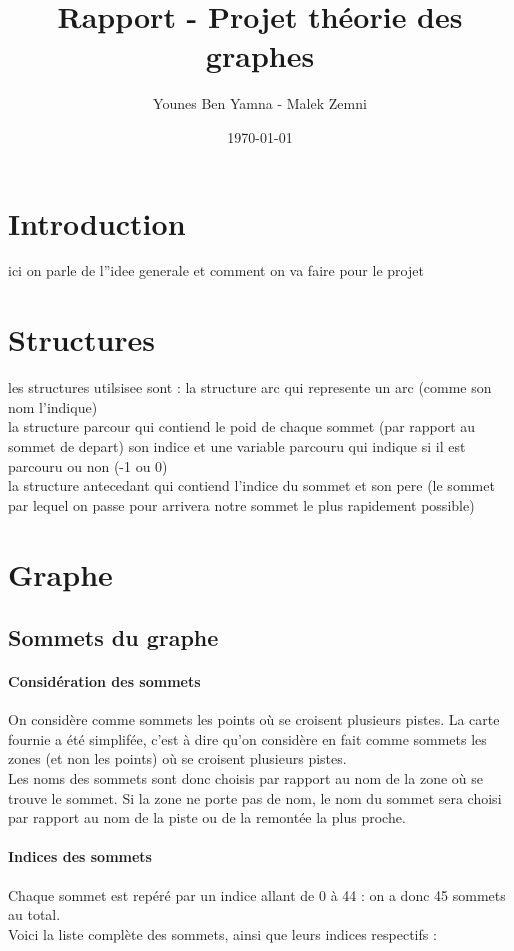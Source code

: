 \documentclass[a4]{article}
\author{Younes Ben Yamna - Malek Zemni}
\title{Rapport - Projet théorie des graphes}
\date{\today}
\begin{document}
\lstset{language=C}
\maketitle

	\section{Introduction}
			ici on parle de l''idee generale et comment on va faire pour le projet
	\section{Structures}
		les structures utilsisee sont :
			la structure arc qui represente un arc (comme son nom l'indique)\\
			la structure parcour qui contiend le poid de chaque sommet (par rapport au sommet de depart)
			 son indice et une variable parcouru qui indique si il est parcouru ou non (-1 ou 0)\\
			la structure antecedant qui contiend l'indice du sommet et son pere (le sommet par lequel on passe pour arrivera notre sommet le plus rapidement possible)
		
	\section{Graphe}
		\subsection{Sommets du graphe}
			\paragraph{Considération des sommets\\}
			On considère comme sommets les points où se croisent plusieurs pistes. La carte fournie a été simplifée, c'est à dire qu'on
			considère en fait comme sommets les zones (et non les points) où se croisent plusieurs pistes.\\
			Les noms des sommets sont donc choisis par rapport au nom de la zone où se trouve le sommet. 
			Si la zone ne porte pas de nom, le nom du sommet sera choisi par rapport au nom de la piste ou de la remontée la plus proche.
			\paragraph{Indices des sommets\\}
			Chaque sommet est repéré par un indice allant de 0 à 44 : on a donc 45 sommets au total.\\
			Voici la liste complète des sommets, ainsi que leurs indices respectifs :
			
\end{document}
